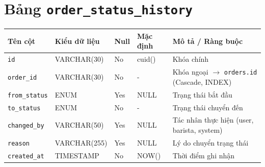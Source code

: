 \documentclass[12pt,a4paper,oneside]{report}
\begin{document}
\section{Bảng \texttt{order\_status\_history}}
\begin{table}[H]
\centering
\small
\begin{tabularx}{\textwidth}{llllX}
\toprule
\textbf{Tên cột} & \textbf{Kiểu dữ liệu} & \textbf{Null} & \textbf{Mặc định} & \textbf{Mô tả / Ràng buộc} \\
\midrule
\texttt{id} & VARCHAR(30) & No & cuid() & Khóa chính \\
\texttt{order\_id} & VARCHAR(30) & No & - & Khóa ngoại \(\to\) \texttt{orders.id} (Cascade, INDEX) \\
\texttt{from\_status} & ENUM & Yes & NULL & Trạng thái bắt đầu \\
\texttt{to\_status} & ENUM & No & - & Trạng thái chuyển đến \\
\texttt{changed\_by} & VARCHAR(50) & Yes & NULL & Tác nhân thực hiện (user, barista, system) \\
\texttt{reason} & VARCHAR(255) & Yes & NULL & Lý do chuyển trạng thái \\
\texttt{created\_at} & TIMESTAMP & No & NOW() & Thời điểm ghi nhận \\
\bottomrule
\end{tabularx}
\end{table}

\end{document}
